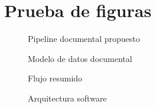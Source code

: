 \documentclass[letterpaper,12pt]{article}
\begin{document}
\section*{Prueba de figuras}





\begin{figure}[H]\centering\caption{Pipeline documental propuesto}\end{figure}
\begin{figure}[H]\centering\caption{Modelo de datos documental}\end{figure}



\begin{figure}[H]\centering\caption{Flujo resumido}\end{figure}







\begin{figure}[H]\centering\caption{Arquitectura software}\end{figure}
\end{document}
